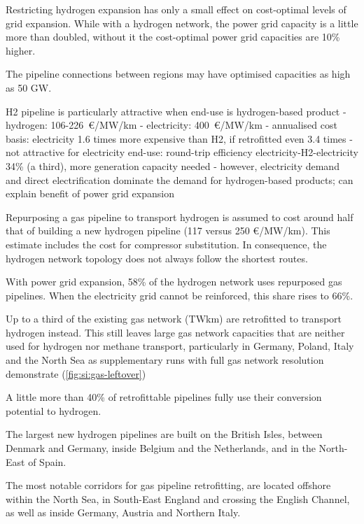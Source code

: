 
Restricting hydrogen expansion has only a small effect on cost-optimal levels of
grid expansion. While with a hydrogen network, the power grid capacity is a
little more than doubled, without it the cost-optimal power grid capacities are
10\% higher.

The pipeline connections between regions may have optimised capacities as high as 50 GW.

H2 pipeline is particularly attractive when end-use is hydrogen-based product
- hydrogen: 106-226~\euro/MW/km
- electricity: 400~\euro/MW/km
- annualised cost basis: electricity 1.6 times more expensive than H2, if retrofitted even 3.4 times
- not attractive for electricity end-use: round-trip efficiency electricity-H2-electricity 34\% (a third), more generation capacity needed
- however, electricity demand and direct electrification dominate the demand for hydrogen-based products; can explain benefit of power grid expansion


Repurposing a gas pipeline to transport hydrogen is assumed to cost around half
that of building a new hydrogen pipeline (117 versus 250 \euro/MW/km). This
estimate includes the cost for compressor substitution. In consequence, the
hydrogen network topology does not always follow the shortest routes.

With power grid expansion, 58\% of the hydrogen network uses repurposed gas
pipelines. When the electricity grid cannot be reinforced, this share rises to
66\%.

Up to a third of the existing gas network (TWkm) are retrofitted to transport
hydrogen instead. This still leaves large  gas network capacities that are
neither used for hydrogen nor methane transport, particularly in Germany,
Poland, Italy and the North Sea as supplementary runs with full gas network
resolution demonstrate (\cref{fig:si:gas-leftover})

A little more than 40\% of retrofittable pipelines fully use their conversion
potential to hydrogen.

The largest new hydrogen pipelines are built on the British Isles, between
Denmark and Germany, inside Belgium and the Netherlands, and in the North-East
of Spain.

The most notable corridors for gas pipeline retrofitting, are located offshore
within the North Sea, in South-East England and crossing the English Channel, as
well as inside Germany, Austria and Northern Italy.

